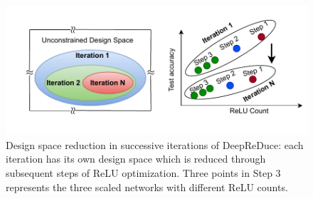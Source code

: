 \begin{figure}[t] \centering
\includegraphics[scale=0.55]{Figures/DesignSpace}
\caption{Design space reduction in successive iterations of DeepReDuce: each iteration has its own design space which is reduced through subsequent steps of ReLU optimization. Three points in Step 3 represents the three scaled networks with different ReLU counts.}
\label{fig:DesignSpace}
\end{figure}